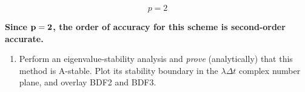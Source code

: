 \begin{adjustwidth}{2.5em}{0pt}
    \vspace{-0.5in}
    \begin{equation*}
        \boxed{p = 2}
    \end{equation*}

    \begin{fminipage}{0.9\linewidth}
        \textbf{Since $\bf p = 2$, the order of accuracy for this scheme is second-order accurate. }
    \end{fminipage}

\end{adjustwidth}

\pagebreak
\begin{enumerate}[label=\alph*., start = 2]
    \item Perform an eigenvalue-stability analysis and \textit{prove} (analytically) that this method is A-stable. \newline Plot its stability boundary in the $\lambda\Delta t$ complex number plane, and overlay BDF2 and BDF3.


\end{enumerate}
